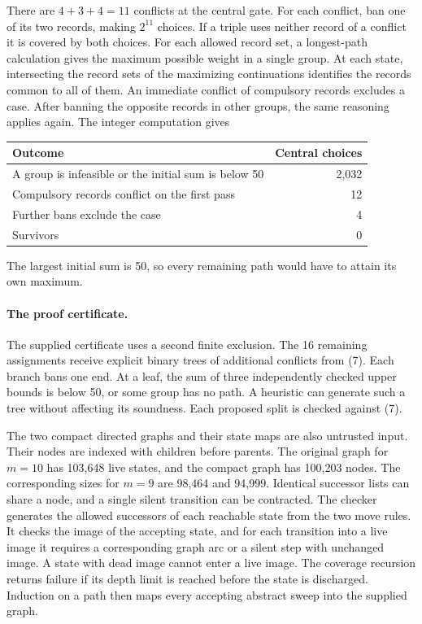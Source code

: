 \documentclass[11pt]{article}
\begin{document}
There are \(4+3+4=11\) conflicts at the central gate. For each conflict, ban one of its two records, making \(2^{11}\) choices. If a triple uses neither record of a conflict it is covered by both choices. For each allowed record set, a longest-path calculation gives the maximum possible weight in a single group. At each state, intersecting the record sets of the maximizing continuations identifies the records common to all of them. An immediate conflict of compulsory records excludes a case. After banning the opposite records in other groups, the same reasoning applies again. The integer computation gives
\begin{center}
\begin{tabular}{lr}
\toprule
Outcome&Central choices\\\midrule
A group is infeasible or the initial sum is below 50&2,032\\
Compulsory records conflict on the first pass&12\\
Further bans exclude the case&4\\\midrule
Survivors&0\\\bottomrule
\end{tabular}
\end{center}
The largest initial sum is 50, so every remaining path would have to attain its own maximum.

\paragraph{The proof certificate.}
The supplied certificate uses a second finite exclusion. The 16 remaining assignments receive explicit binary trees of additional conflicts from (7). Each branch bans one end. At a leaf, the sum of three independently checked upper bounds is below 50, or some group has no path. A heuristic can generate such a tree without affecting its soundness. Each proposed split is checked against (7).

The two compact directed graphs and their state maps are also untrusted input. Their nodes are indexed with children before parents. The original graph for \(m=10\) has 103,648 live states, and the compact graph has 100,203 nodes. The corresponding sizes for \(m=9\) are 98,464 and 94,999. Identical successor lists can share a node, and a single silent transition can be contracted. The checker generates the allowed successors of each reachable state from the two move rules. It checks the image of the accepting state, and for each transition into a live image it requires a corresponding graph arc or a silent step with unchanged image. A state with dead image cannot enter a live image. The coverage recursion returns failure if its depth limit is reached before the state is discharged. Induction on a path then maps every accepting abstract sweep into the supplied graph.
\end{document}
